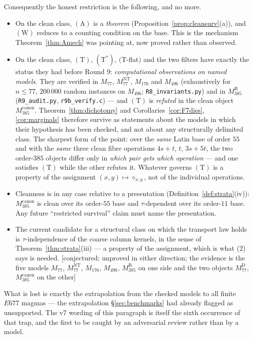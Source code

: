 \documentclass[11pt]{article}
\theoremstyle{plain}
\theoremstyle{definition}
\theoremstyle{remark}
\numberwithin{equation}{section}
\newcommand{\statusbox}[1]{{\small\sloppy\textsf{[#1]}}}
\newcommand{\CONJ}[1]{\statusbox{conjectured; #1}}
\begin{document}
Consequently the honest restriction is the following, and no more.
\begin{itemize}
\item[(1)] On the clean class, $(\mathrm{A})$ is a \emph{theorem}
(Proposition~\ref{prop:cleansurv}(a)), and $(\mathrm{W})$ reduces to a counting
condition on the base. This is the mechanism Theorem~\ref{thm:Amech} was
pointing at, now proved rather than observed.
\item[(2)] On the clean class, $(\mathrm{T})$, $(\mathrm{T}^{*})$,
$(\mathrm{T}$-flat$)$ and the two filters have exactly the status they had
before Round 9: \emph{computational observations on named models}. They are
verified in $M_{77}$, $M_{77}^{\mathrm{NT}}$, $M_{176}$ and $M_{496}$
(exhaustively for $n\le77$, $200\,000$ random instances on $M_{496}$;
\texttt{R8\_invariants.py}) and in $M_{385}^{\mathrm{R}}$ (\texttt{R9\_audit.py},
\texttt{r9b\_verify.c}) --- and $(\mathrm{T})$ is \emph{refuted} in the clean
object $M_{385}^{\mathrm{canon}}$. Theorem~\ref{thm:dichotomy} and
Corollaries~\ref{cor:F7dies}, \ref{cor:marginals} therefore survive as statements
about the models in which their hypothesis has been checked, and not about any
structurally delimited class. The sharpest form of the point: over the
\emph{same} Latin base of order $55$ and with the \emph{same} three clean fibre
operations $4s+t$, $t$, $3s+5t$, the two order-$385$ objects differ only in
\emph{which pair gets which operation} --- and one satisfies $(\mathrm{T})$
while the other refutes it. Whatever governs $(\mathrm{T})$ is a property of the
assignment $(x,y)\mapsto\diamond_{x,y}$, not of the individual operations.
\item[(3)] Cleanness is in any case relative to a presentation
(Definition~\ref{def:strata}(iv)): $M_{385}^{\mathrm{canon}}$ is clean over its
order-$55$ base and $\tau$-dependent over its order-$11$ base. Any future
``restricted survival'' claim must name the presentation.
\item[(4)] The current candidate for a structural class on which the transport
law holds is $\tau$-independence of the coarse column kernels, in the sense of
Theorem~\ref{thm:strata}(iii) --- a property of the assignment, which is what
(2) says is needed. \CONJ{unproved in either direction; the evidence is the five
models $M_{77}$, $M_{77}^{\mathrm{NT}}$, $M_{176}$, $M_{496}$,
$M_{385}^{\mathrm{R}}$ on one side and the two objects
$M_{77}^{\mathrm{D}}$, $M_{385}^{\mathrm{canon}}$ on the other}
\end{itemize}
What is lost is exactly the extrapolation from the checked models to all finite
$E677$ magmas --- the extrapolation \S\ref{sec:benchmarks} had already flagged as
unsupported. The v7 wording of this paragraph is itself the sixth occurrence of
that trap, and the first to be caught by an adversarial review rather than by a
model.
\end{document}
